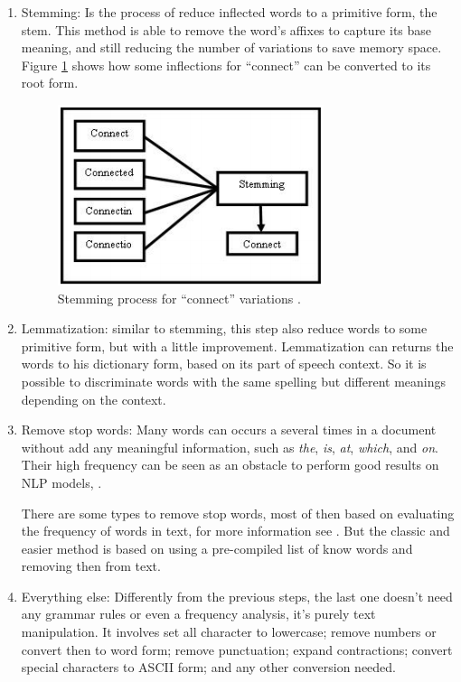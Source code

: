 	\begin{enumerate}
		\item Stemming: Is the process of reduce inflected words to a primitive form, the stem. This method is able to remove the word's affixes to capture its base meaning, and still reducing the number of variations to save memory space. Figure \ref{fig:stemming} shows how some inflections for ``connect'' can be converted to its root form.
		
		\begin{figure}[h!]
			\centering
			\includegraphics[width=0.45\linewidth]{01.Chapters/02.Background/stemming}
			\caption{Stemming process for ``connect'' variations \cite{vijayarani2015preprocessing}.}
			\label{fig:stemming}
		\end{figure}
		
		
		\item Lemmatization: similar to stemming, this step also reduce words to some primitive form, but with a little improvement. Lemmatization can returns the words to his dictionary form, based on its part of speech context. So it is possible to discriminate words with the same spelling but different meanings depending on the context. 	
		
		\item Remove stop words:
		Many words can occurs a several times in a document without add any meaningful information, such as \textit{the}, \textit{is}, \textit{at}, \textit{which}, and \textit{on}. Their high frequency can be seen as an obstacle to perform good results on NLP models, \cite{kannan2014preprocessing}. 
		
		There are some types to remove stop words, most of then based on evaluating the frequency of words in text, for more information see \cite{vijayarani2015preprocessing}. But the classic and easier method is based on using a pre-compiled list of know words and removing then from text.
		
		\item Everything else:
		Differently from the previous steps, the last one doesn't need any grammar rules or even a frequency analysis, it's purely text manipulation. It involves set all character to lowercase; remove numbers or convert then to word form; remove punctuation; expand contractions; convert special characters to ASCII form; and any other conversion needed.		 	
	\end{enumerate}
	
